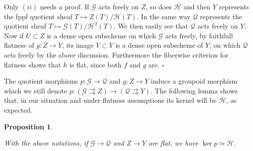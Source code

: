 \documentclass{amsart}
\newenvironment{demo}{{\flushleft \bf Proof~:}}{\hfill $\square$ \vspace{5mm}}
\newtheorem{prop}{Proposition}[section]
\theoremstyle{definition}
\theoremstyle{remark}
\begin{document}
\begin{demo}

Only $(ii)$ needs a proof. If ${{\mathcal G}}$ acts freely on $Z$, so does ${{\mathcal H}}$ and then $Y$ represents the fppf quotient sheaf $T \mapsto Z(T)/{{\mathcal H}}(T)$. In the same way ${{\mathcal Q}}$ represents the quotient sheaf $T \mapsto {{\mathcal G}}(T)/{{\mathcal H}}^2(T)$. We then easily see that ${{\mathcal Q}}$ acts freely on $Y$. 
Now if $U \subset Z$ is a dense open subscheme on which ${{\mathcal G}}$ acts freely, by faithfull flatness of $g : Z {\longrightarrow} Y$, its image $V \subset Y$ is a dense open subscheme of $Y$, on which ${{\mathcal Q}}$ acts freely by the above discussion. Furthermore the fiberwise criterion for flatness shows that $h$ is flat, since both $f$ and $g$ are. 
\end{demo}

The quotient morphisms $p : {{\mathcal G}} {\longrightarrow} {{\mathcal Q}}$ and $g : Z {\longrightarrow} Y$ induce a groupoid morphism which we still denote $p : ({{\mathcal G}} {\rightrightarrows} Z) {\longrightarrow} ({{\mathcal Q}} {\rightrightarrows} Y)$. The following lemma shows that, in our situation and under flatness assumptions its kernel will be ${{\mathcal H}}$, as expected.

\begin{prop}
\label{ker}

With the above notations, if ${{\mathcal G}} {\longrightarrow} {{\mathcal Q}}$ and $Z {\longrightarrow} Y$ are flat, we have $\ker p \simeq {{\mathcal H}}$.
\end{prop}
\end{document}
